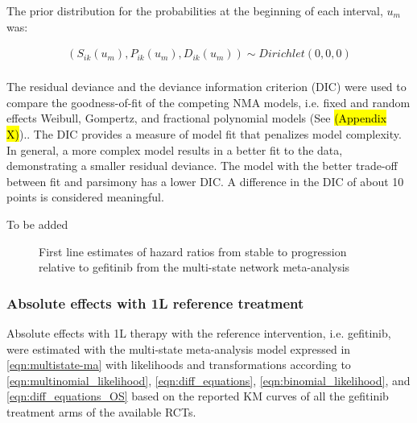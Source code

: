\documentclass[11pt,final,fleqn]{article}\usepackage[]{graphicx}\usepackage[]{color}
\theoremstyle{plain}
\newcounter{subsubsubsection}[subsubsection]
\begin{document}
{The prior distribution for the probabilities at the beginning of each interval, $u_{m}$ was: 

\begin{equation} \label{eqn:multinomial-prior}
\begin{aligned}
(S_{ik}(u_{m}),P_{ik}(u_{m}),D_{ik}(u_{m})) \sim Dirichlet(0,0,0) \\
\end{aligned}
\end{equation}


The residual deviance and the deviance information criterion (DIC) were used to compare the goodness-of-fit of the competing NMA models, i.e. fixed and random effects Weibull, Gompertz, and fractional polynomial models (See \hl{(Appendix X)}).\citep{dias2018network}. The DIC provides a measure of model fit that penalizes model complexity. In general, a more complex model results in a better fit to the data, demonstrating a smaller residual deviance. The model with the better trade-off between fit and parsimony has a lower DIC. A difference in the DIC of about 10 points is considered meaningful. 


To be added

\begin{figure}[h]
\centering
\caption{First line estimates of hazard ratios from stable to progression relative to gefitinib from the multi-state network meta-analysis}\label{fig:hr-1L}
\end{figure}


\subsubsection{Absolute effects with 1L reference treatment}
Absolute effects with 1L therapy with the reference intervention, i.e. gefitinib, were estimated with the multi-state meta-analysis model expressed in \autoref{eqn:multistate-ma} with likelihoods and transformations according to \autoref{eqn:multinomial_likelihood}, \autoref{eqn:diff_equations}, \autoref{eqn:binomial_likelihood}, and \autoref{eqn:diff_equations_OS} based on the reported KM curves of all the gefitinib treatment arms of the available RCTs.

}
\end{document}
